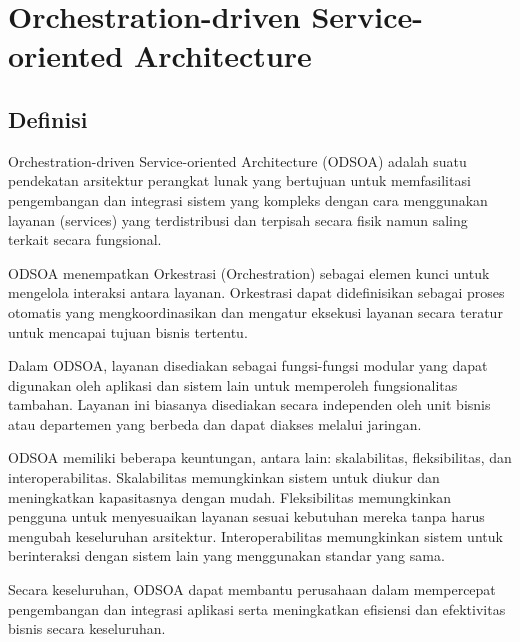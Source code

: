 \chapter{Orchestration-driven Service-oriented Architecture}

\section{Definisi}
Orchestration-driven Service-oriented Architecture (ODSOA) adalah suatu pendekatan arsitektur perangkat lunak yang bertujuan untuk memfasilitasi pengembangan dan integrasi sistem yang kompleks dengan cara menggunakan layanan (services) yang terdistribusi dan terpisah secara fisik namun saling terkait secara fungsional.

ODSOA menempatkan Orkestrasi (Orchestration) sebagai elemen kunci untuk mengelola interaksi antara layanan. Orkestrasi dapat didefinisikan sebagai proses otomatis yang mengkoordinasikan dan mengatur eksekusi layanan secara teratur untuk mencapai tujuan bisnis tertentu.

Dalam ODSOA, layanan disediakan sebagai fungsi-fungsi modular yang dapat digunakan oleh aplikasi dan sistem lain untuk memperoleh fungsionalitas tambahan. Layanan ini biasanya disediakan secara independen oleh unit bisnis atau departemen yang berbeda dan dapat diakses melalui jaringan.

ODSOA memiliki beberapa keuntungan, antara lain: skalabilitas, fleksibilitas, dan interoperabilitas. Skalabilitas memungkinkan sistem untuk diukur dan meningkatkan kapasitasnya dengan mudah. Fleksibilitas memungkinkan pengguna untuk menyesuaikan layanan sesuai kebutuhan mereka tanpa harus mengubah keseluruhan arsitektur. Interoperabilitas memungkinkan sistem untuk berinteraksi dengan sistem lain yang menggunakan standar yang sama.

Secara keseluruhan, ODSOA dapat membantu perusahaan dalam mempercepat pengembangan dan integrasi aplikasi serta meningkatkan efisiensi dan efektivitas bisnis secara keseluruhan.
	
